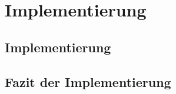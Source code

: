 
\chapter{Implementierung}
\label{chapter-implementierung}


\section{Implementierung}


\section{Fazit der Implementierung}